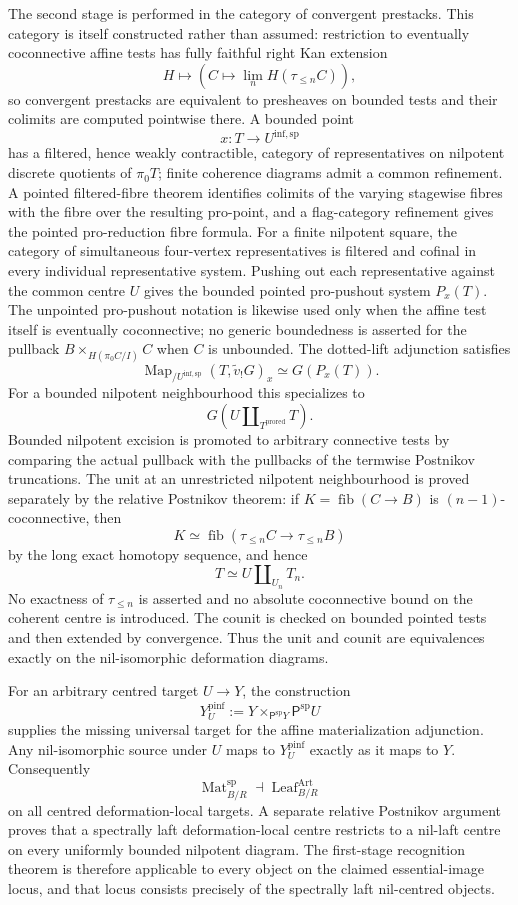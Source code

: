 The second stage is performed in the category of convergent prestacks.  This
category is itself constructed rather than assumed: restriction to eventually
coconnective affine tests has fully faithful right Kan extension
\[
    H\longmapsto
    \left(
      C\longmapsto
      \lim_nH(\tau_{\leq n}C)
    \right),
\]
so convergent prestacks are equivalent to presheaves on bounded tests and
their colimits are computed pointwise there.  A bounded point
\[
    x:T\longrightarrow U^{\mathrm{inf,sp}}
\]
has a filtered, hence weakly contractible, category of representatives on
nilpotent discrete quotients of $\pi_0T$; finite coherence diagrams admit a
common refinement.  A pointed filtered-fibre theorem identifies colimits of
the varying stagewise fibres with the fibre over the resulting pro-point, and
a flag-category refinement gives the pointed pro-reduction fibre formula.
For a finite nilpotent square, the category of simultaneous four-vertex
representatives is filtered and cofinal in every individual representative
system.  Pushing out each representative against the common centre $U$ gives
the bounded pointed pro-pushout system $P_x(T)$.  The
unpointed pro-pushout notation is likewise used only when the affine test
itself is eventually coconnective; no generic boundedness is asserted for the
pullback
$B\times_{H(\pi_0C/I)}C$
when $C$ is unbounded.  The dotted-lift adjunction satisfies
\[
\boxed{
    \operatorname{Map}_{/U^{\mathrm{inf,sp}}}
    (T,\widetilde v_!G)_x
    \simeq
    G(P_x(T)).}
\]
For a bounded nilpotent neighbourhood this specializes to
\[
    G(U\amalg_{T^{\mathrm{prored}}}T).
\]
Bounded nilpotent excision is promoted to arbitrary connective tests by
comparing the actual pullback with the pullbacks of the termwise Postnikov
truncations.  The unit at an unrestricted nilpotent neighbourhood is proved
separately by the relative Postnikov theorem: if
$K=\operatorname{fib}(C\to B)$ is $(n-1)$-coconnective, then
\[
    K
    \simeq
    \operatorname{fib}(\tau_{\leq n}C\to\tau_{\leq n}B)
\]
by the long exact homotopy sequence, and hence
\[
    T\simeq U\amalg_{U_n}T_n.
\]
No exactness of $\tau_{\leq n}$ is asserted and no absolute coconnective
bound on the coherent centre is introduced.  The
counit is checked on bounded pointed tests and then extended by convergence.
Thus the unit and counit are equivalences exactly on the nil-isomorphic
deformation diagrams.

For an arbitrary centred target $U\to Y$, the construction
\[
    Y_U^{\mathrm{pinf}}
    :=
    Y\times_{\mathsf P^{\mathrm{sp}}Y}
    \mathsf P^{\mathrm{sp}}U
\]
supplies the missing universal target for the affine materialization
adjunction.  Any nil-isomorphic source under $U$ maps to
$Y_U^{\mathrm{pinf}}$ exactly as it maps to $Y$.  Consequently
\[
\boxed{
    \operatorname{Mat}^{\mathrm{sp}}_{B/R}
    \dashv
    \operatorname{Leaf}^{\mathrm{Art}}_{B/R}}
\]
on all centred deformation-local targets.  A separate relative Postnikov
argument proves that a spectrally laft deformation-local centre restricts to a
nil-laft centre on every uniformly bounded nilpotent diagram.  The first-stage
recognition theorem is therefore applicable to every object on the claimed
essential-image locus, and that locus consists precisely of the spectrally
laft nil-centred objects.

